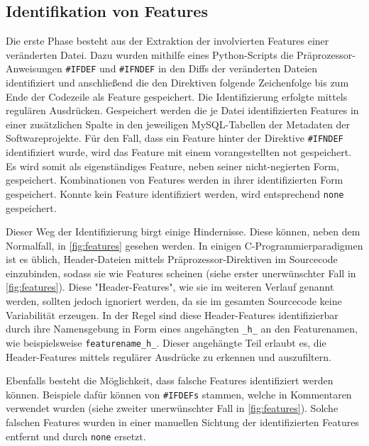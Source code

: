 \subsection*{Identifikation von Features}

Die erste Phase besteht aus der Extraktion der involvierten Features einer veränderten Datei. Dazu wurden mithilfe eines Python-Scripts die Präprozessor-Anweisungen \texttt{\#IFDEF} und \texttt{\#IFNDEF} in den Diffs der veränderten Dateien identifiziert und anschließend die den Direktiven folgende Zeichenfolge bis zum Ende der Codezeile als Feature gespeichert. Die Identifizierung erfolgte mittels regulären Ausdrücken. Gespeichert werden die je Datei identifizierten Features in einer zusätzlichen Spalte in den jeweiligen MySQL-Tabellen der Metadaten der Softwareprojekte. Für den Fall, dass ein Feature hinter der Direktive \texttt{\#IFNDEF} identifiziert wurde, wird das Feature mit einem vorangestellten \glqq not\grqq{} gespeichert. Es wird somit als eigenständiges Feature, neben seiner nicht-negierten Form, gespeichert. Kombinationen von Features werden in ihrer identifizierten Form gespeichert. Konnte kein Feature identifiziert werden, wird entsprechend \glqq \texttt{none}\grqq{} gespeichert.

Dieser Weg der Identifizierung birgt einige Hindernisse. Diese können, neben dem Normalfall, in \autoref{fig:features} gesehen werden. In einigen C-Programmierparadigmen ist es üblich, Header-Dateien mittels Präprozessor-Direktiven im Sourcecode einzubinden, sodass sie wie Features scheinen (siehe erster unerwünschter Fall in \autoref{fig:features}). Diese "Header-Features", wie sie im weiteren Verlauf genannt werden, sollten jedoch ignoriert werden, da sie im gesamten Sourcecode keine Variabilität erzeugen. In der Regel sind diese Header-Features identifizierbar durch ihre Namensgebung in Form eines angehängten \texttt{\_h\_} an den Featurenamen, wie beispielsweise \texttt{featurename\_h\_}. Dieser angehängte Teil erlaubt es, die Header-Features mittels regulärer Ausdrücke zu erkennen und auszufiltern. 

Ebenfalls besteht die Möglichkeit, dass \glqq falsche\grqq{} Features identifiziert werden können. Beispiele dafür können von \texttt{\#IFDEFs} stammen, welche in Kommentaren verwendet wurden (siehe zweiter unerwünschter Fall in \autoref{fig:features}). Solche falschen Features wurden in einer manuellen Sichtung der identifizierten Features entfernt und durch \glqq \texttt{none}\grqq{} ersetzt.

